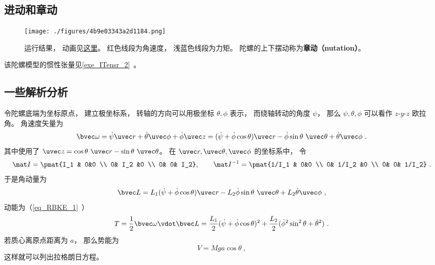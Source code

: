 
\begin{issues}
\issueDraft
\end{issues}


\subsection{进动和章动}

\begin{figure}[ht]
\centering
\texttt{[image: ./figures/4b9e03343a2d1184.png]}
\caption{运行结果， 动画见\href{https://wuli.wiki/apps/Top.html}{这里}。 红色线段为角速度， 浅蓝色线段为力矩。 陀螺的上下摆动称为\textbf{章动（nutation）}。} \label{fig_TopNum_1}
\end{figure}

该陀螺模型的惯性张量见\autoref{exe_ITensr_2}~。

\subsection{一些解析分析}
令陀螺底端为坐标原点， 建立极坐标系， 转轴的方向可以用极坐标 $\theta, \phi$ 表示， 而绕轴转动的角度 $\psi$， 那么 $\psi, \theta, \phi$ 可以看作 $z$-$y$-$z$ 欧拉角。 角速度矢量为
\begin{equation}
\bvec\omega
= \dot\psi\uvec r + \dot\theta\uvec\phi + \dot\phi\uvec z
= (\dot\psi + \dot\phi\cos\theta)\uvec r - \dot\phi\sin\theta\ \uvec\theta +
 \dot\theta\uvec\phi~.
\end{equation}
其中使用了 $\uvec z = \cos\theta\ \uvec r - \sin\theta\ \uvec\theta$。 在 $\uvec r, \uvec\theta, \uvec \phi$ 的坐标系中， 令
\begin{equation}
\mat I = \pmat{I_1 & 0&0 \\ 0& I_2 &0 \\ 0& 0& I_2}, \qquad
\mat I^{-1} = \pmat{1/I_1 & 0&0 \\ 0& 1/I_2 &0 \\ 0& 0& 1/I_2}~.
\end{equation}
于是角动量为
\begin{equation}
\bvec L = L_1(\dot\psi + \dot\phi\cos\theta)\uvec r - L_2\dot\phi\sin\theta\ \uvec\theta + L_2\dot\theta\uvec\phi~,
\end{equation}
动能为（\autoref{eq_RBKE_1}~）
\begin{equation}
T = \frac{1}{2}\bvec\omega\vdot\bvec L = \frac{L_1}{2}(\dot\psi + \dot\phi\cos\theta)^2 + \frac{L_2}{2}(\dot\phi^2\sin^2\theta + \dot\theta^2)~.
\end{equation}
若质心离原点距离为 $a$， 那么势能为
\begin{equation}
V = Mga\cos\theta~,
\end{equation}
这样就可以列出拉格朗日方程。

